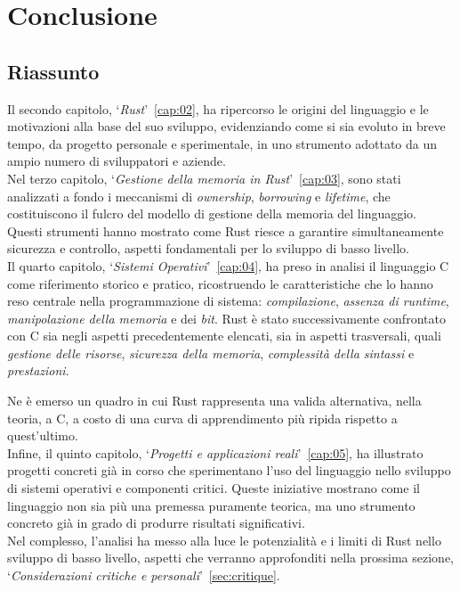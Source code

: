 
\chapter{Conclusione}\label{cap:06}
\section{Riassunto}
Il secondo capitolo, `\textit{Rust}'~\ref{cap:02}, ha ripercorso le origini del linguaggio e le motivazioni alla base del suo sviluppo, 
evidenziando come si sia evoluto in breve tempo, da progetto personale e sperimentale, in uno strumento adottato da un ampio numero di sviluppatori e aziende. \hfill
\vspace{10pt}\\
\noindent Nel terzo capitolo, `\textit{Gestione della memoria in Rust}'~\ref{cap:03}, sono stati analizzati a fondo i meccanismi di \textit{ownership}, \textit{borrowing} e \textit{lifetime}, che costituiscono 
il fulcro del modello di gestione della memoria del linguaggio. 
Questi strumenti hanno mostrato come Rust riesce a garantire simultaneamente sicurezza e controllo, aspetti
fondamentali per lo sviluppo di basso livello. \hfill
\vspace{10pt}\\
\noindent Il quarto capitolo, `\textit{Sistemi Operativi}'~\ref{cap:04}, ha preso in analisi il linguaggio C come riferimento
storico e pratico, ricostruendo le caratteristiche che lo hanno reso centrale nella programmazione di sistema: 
\textit{compilazione}, \textit{assenza di runtime}, \textit{manipolazione della memoria} e dei \textit{bit}.
Rust è stato successivamente confrontato con C sia negli aspetti precedentemente elencati, sia in 
aspetti trasversali, quali \textit{gestione delle risorse}, \textit{sicurezza della memoria}, \textit{complessità della sintassi} e \textit{prestazioni}.

Ne è emerso un quadro in cui Rust rappresenta una valida alternativa, nella teoria, a C, 
a costo di una curva di apprendimento più ripida rispetto a quest'ultimo. \hfill
\vspace{10pt}\\
\noindent Infine, il quinto capitolo, `\textit{Progetti e applicazioni reali}'~\ref{cap:05}, ha illustrato progetti
concreti già in corso che sperimentano l'uso del linguaggio nello sviluppo di sistemi operativi e 
componenti critici. Queste iniziative mostrano come il linguaggio non sia più una 
premessa puramente teorica, ma uno strumento concreto già in grado di produrre risultati significativi. \hfill
\vspace{10pt}\\
\noindent Nel complesso, l'analisi ha messo alla luce le potenzialità e i limiti di Rust nello sviluppo di 
basso livello, aspetti che verranno approfonditi nella prossima sezione, `\textit{Considerazioni critiche e personali}'~\ref{sec:critique}.

